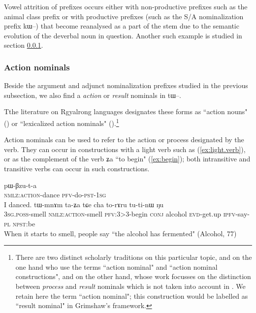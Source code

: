 \documentclass[oldfontcommands,oneside,a4paper,11pt]{article}
\newcommand{\ipa}[1]{{\phon \mbox{#1}}} %
\begin{document}
Vowel attrition of prefixes occurs either with non-productive prefixes such as the animal class prefix or with productive prefixes (such as the S/A nominalization prefix \ipa{kɯ}--) that become reanalysed as a part of the stem due to the semantic evolution of the deverbal noun in question. Another such example is studied in section \ref{subsubsec:action}.



\subsubsection{Action nominals } \label{subsubsec:action}
Beside the argument and adjunct nominalization prefixes studied in the previous subsection, we also find a \textit{action} or \textit{result} nominals in \ipa{tɯ}--. 

Tthe literature on Rgyalrong languages designates these forms as ``action nouns" (\citealt[455]{jacques04these}) or ``lexicalized action nominals" (\citealt{jacksonlin07}).\footnote{There are two distinct scholarly traditions on this particular topic, \citet{comrie76nmlz} and \citet[5]{koptjevskaja93nmlz} on the one hand who use the terms ``action nominal" and ``action nominal constructions", and \citealt{grimshaw90argument} on the other hand, whose work focusses on the distinction between \textit{process} and \textit{result} nominals which is not taken into account in \citet{koptjevskaja93nmlz}. We retain here the term ``action nominal"; this construction would be labelled as ``result nominal" in Grimshaw's framework.}
 
Action nominals can be used to refer to the action or process designated by the verb. They can occur in constructions with a light verb such as  (\ref{ex:light.verb}), or as the complement of the verb \ipa{ʑa} ``to begin" (\ref{ex:begin}); both intransitive and transitive verbs can occur in such constructions.

\begin{exe}
\ex \label{ex:light.verb}
\gll \ipa{tɯ-rɟaʁ} \ipa{pɯ-βzu-t-a} \\
\textsc{nmlz:action}-dance \textsc{pfv}-do-\textsc{pst-1sg} \\
\glt I danced.
\ex \label{ex:begin}
\gll \ipa{ɯ-di}   	\ipa{tɯ-mnɤm}   	\ipa{ta-ʑa}   	\ipa{tɕe}   	\ipa{cha}   	\ipa{to-rɤru}   	\ipa{tu-ti-nɯ}   	\ipa{ŋu}   \\
\textsc{3sg.poss}-smell \textsc{nmlz:action}-smell \textsc{pfv:3>3}-begin \textsc{conj} alcohol \textsc{evd}-get.up \textsc{ipfv}-say-\textsc{pl} \textsc{npst}:be \\
\glt When it starts to smell, people say ``the alcohol has fermented" (Alcohol, 77)
\end{exe} 
\end{document}
